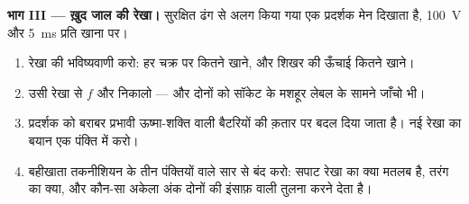 \begin{problem}
\medskip\noindent\textbf{भाग III --- ख़ुद जाल की रेखा।}
सुरक्षित ढंग से अलग किया गया एक प्रदर्शक मेन दिखाता है, \qty{100}{V}
और \qty{5}{ms} प्रति खाना पर।
\begin{enumerate}[resume]
  \item रेखा की भविष्यवाणी करो: हर चक्र पर कितने खाने, और शिखर की
        ऊँचाई कितने खाने।
  \item उसी रेखा से $f$ और  निकालो --- और दोनों को
        सॉकेट के मशहूर लेबल के सामने जाँचो भी।
  \item प्रदर्शक को बराबर प्रभावी ऊष्मा-शक्ति वाली बैटरियों की क़तार
        पर बदल दिया जाता है। नई रेखा का बयान एक पंक्ति में करो।
  \item बहीखाता तकनीशियन के तीन पंक्तियों वाले सार से बंद करो: सपाट
        रेखा का क्या मतलब है, तरंग का क्या, और कौन-सा अकेला अंक दोनों
        की इंसाफ़ वाली तुलना करने देता है।
\end{enumerate}
\end{problem}
